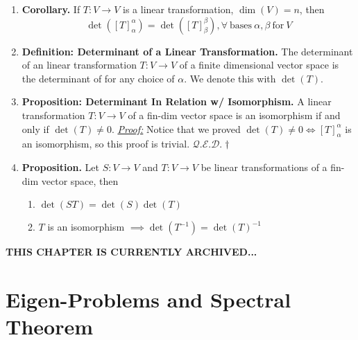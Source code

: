 \documentclass[oneside, 12pt]{book}
\newcommand{\settag}[1]{\renewcommand{\theenumi}{#1}}
\newcommand{\qed}{\hfill $\mathcal{Q}.\mathcal{E}.\mathcal{D}.\dagger$}
\newcommand{\tbf}[1]{\textbf{#1}}
\newcommand{\tit}[1]{\textit{#1}}
\newcommand{\proof}{\tit{\underline{Proof:}}} %
\newcommand{\trans}[3]{$#1:#2\rightarrow{}#3$}
\newcommand{\map}[3]{\text{$\left[#1\right]_{#2}^{#3}$}}
\newcommand{\para}[1]{\item \tbf{#1}}
\begin{document}
\begin{enumerate}
    \settag{3.3.8}
    \para{Corollary.} If \trans{T}{V}{V} is a linear transformation, $\dim(V) = n$, then
    \begin{equation*}
        \det(\map{T}{\alpha}{\alpha}) = \det(\map{T}{\beta}{\beta}),\forall~\text{bases}~\alpha, \beta~\text{for}~V
    \end{equation*}
    
    \settag{3.3.9}
    \para{Definition: Determinant of a Linear Transformation.} The determinant of an linear transformation \trans{T}{V}{V} of a finite dimensional vector space is the determinant of \map{T}{\alpha}{\alpha} for any choice of $\alpha$. We denote this with $\det(T)$.
    
    \settag{3.3.11}
    \para{Proposition: Determinant In Relation w/ Isomorphism.} A linear transformation \trans{T}{V}{V} of a fin-dim vector space is an isomorphism if and only if $\det(T)\neq 0$. \newline
    \proof \newline
    Notice that we proved $\det(T)\neq 0 \iff \map{T}{\alpha}{\alpha}$ is an isomorphism, so this proof is trivial. \qed
    
    \settag{3.3.12}
    \para{Proposition.} Let \trans{S}{V}{V} and \trans{T}{V}{V} be linear transformations of a fin-dim vector space, then 
    \begin{enumerate}
        \item $\det(ST) = \det(S)\det(T)$
        \item $T$ is an isomorphism $\implies \det(T^{-1}) = \det(T)^{-1}$
    \end{enumerate}
\end{enumerate}

\begin{center}
\begin{large}
\tbf{THIS CHAPTER IS CURRENTLY ARCHIVED...}
\end{large}
\end{center}


\chapter{Eigen-Problems and Spectral Theorem}
\end{document}
